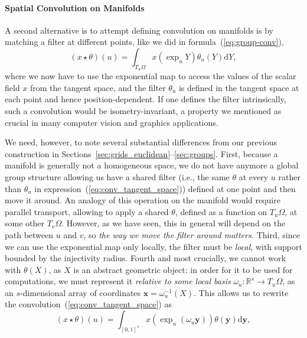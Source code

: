 



\paragraph{Spatial Convolution on Manifolds}

A second alternative is to attempt defining convolution on manifolds is by matching a filter at different points, like we did in formula~(\ref{eq:group-conv}), 
%
\begin{equation}
(x \star \theta)(u) = \int_{T_u \Omega} x(\exp_u Y) \theta_u(Y) \mathrm{d}Y, 
\label{eq:conv_tangent_space}
\end{equation}
%
where we now have to use the exponential map to access the values of the scalar field $x$ from the tangent space, and 
the filter $\theta_u$ is defined in the tangent space at each point and hence position-dependent. %
If one defines the filter intrinsically, such a convolution would be isometry-invariant, a property we mentioned as crucial in many computer vision and graphics applications. 


We need, however, to note several substantial differences from our previous construction in Sections~\ref{sec:grids_euclidean}--\ref{sec:groups}. 
%
First, because a manifold is generally not a homogeneous space, we do not have anymore a global group structure allowing us have a shared filter (i.e., the same $\theta$ at every $u$ rather than $\theta_u$ in expression~(\ref{eq:conv_tangent_space})) defined at one point and then move it around. 
%
An analogy of this operation on the manifold would require parallel transport, allowing to apply a shared $\theta$, defined as a function on $T_u\Omega$, at some other $T_v\Omega$.   
%
However, as we have seen, this in general will depend on the path between $u$ and $v$, so {\em the way we move the filter around matters.}%
%
%
Third, since we can use the exponential map only locally, the filter must be {\em local}, with support bounded by the injectivity radius.  
%
Fourth 
and most crucially, we cannot work with $\theta(X)$, as $X$ is an abstract geometric object: in order for it to be used for computations, we must represent it {\em relative to some local basis}  
$\omega_u : \mathbb{R}^s \rightarrow T_u\Omega$, as an $s$-dimensional array of coordinates $\mathbf{x} = \omega^{-1}_u(X)$. 
%
This allows us to rewrite the convolution~(\ref{eq:conv_tangent_space}) as 
%
\begin{equation}
(x \star \theta)(u) = \int_{[0,1]^s} x(\exp_u (\omega_u \mathbf{y})) \theta(\mathbf{y}) \mathrm{d}\mathbf{y}, 
\label{eqn:conv_exp}
\end{equation}
%

